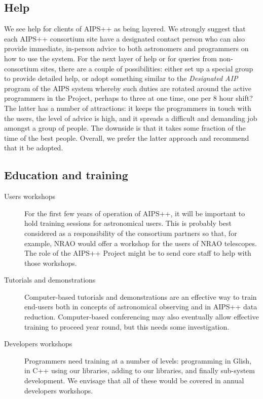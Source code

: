 \subsection{Help}

We see help for clients of AIPS++ as being layered. We strongly
suggest that each AIPS++ consortium site have a designated contact
person who can also provide immediate, in-person advice to both
astronomers and programmers on how to use the system.  For the next
layer of help or for queries from non-consortium sites, there are a
couple of possibilities: either set up a special group to provide
detailed help, or adopt something similar to the {\em Designated AIP}
program of the AIPS system whereby such duties are rotated around the
active programmers in the Project, perhaps to three at one time, one
per 8 hour shift? The latter has a number of attractions: it keeps the
programmers in touch with the users, the level of advice is high, and
it spreads a difficult and demanding job amongst a group of
people. The downside is that it takes some fraction of the time of the
best people. Overall, we prefer the latter approach and recommend that
it be adopted.

\subsection{Education and training}

\begin{description}
\item[Users workshops] For the first few years of operation of
AIPS++, it will be important to hold training sessions for
astronomical users. This is probably best considered as a
responsibility of the consortium partners so that, for example, NRAO
would offer a workshop for the users of NRAO telescopes. The role of
the AIPS++ Project might be to send core staff to help with those
workshops.  
\item[Tutorials and demonstrations] Computer-based tutorials and
demonstrations are an effective way to train end-users both in
concepts of astronomical observing and in AIPS++ data reduction.
Computer-based conferencing may also eventually allow effective
training to proceed year round, but this needs some investigation.
\item[Developers workshops] Programmers need training at a number of
levels: programming in Glish, in C++ using our libraries, adding to
our libraries, and finally sub-system development. We envisage that
all of these would be covered in annual developers workshops.
\end{description}

